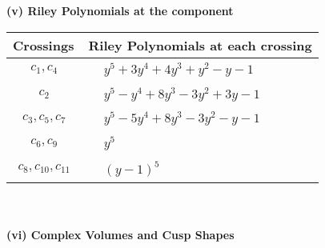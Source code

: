 \documentclass[1p]{elsarticle_modified}
\theoremstyle{definition}
\begin{document}
\newpage\renewcommand{\arraystretch}{1}
\flushleft \textbf{(v) Riley Polynomials at the component}\newline \\
\begin{tabular}{m{50pt}|m{274pt}}
Crossings & \hspace{64pt}Riley Polynomials at each crossing \\
\hline $$\begin{aligned}c_{1},c_{4}\end{aligned}$$&$\begin{aligned}
&y^5+3 y^4+4 y^3+y^2- y-1
\end{aligned}$\\
\hline $$\begin{aligned}c_{2}\end{aligned}$$&$\begin{aligned}
&y^5- y^4+8 y^3-3 y^2+3 y-1
\end{aligned}$\\
\hline $$\begin{aligned}c_{3},c_{5},c_{7}\end{aligned}$$&$\begin{aligned}
&y^5-5 y^4+8 y^3-3 y^2- y-1
\end{aligned}$\\
\hline $$\begin{aligned}c_{6},c_{9}\end{aligned}$$&$\begin{aligned}
&y^5
\end{aligned}$\\
\hline $$\begin{aligned}c_{8},c_{10},c_{11}\end{aligned}$$&$\begin{aligned}
&(y-1)^5
\end{aligned}$\\
\hline
\end{tabular}\\~\\
\newpage\flushleft \textbf{(vi) Complex Volumes and Cusp Shapes}
\end{document}
